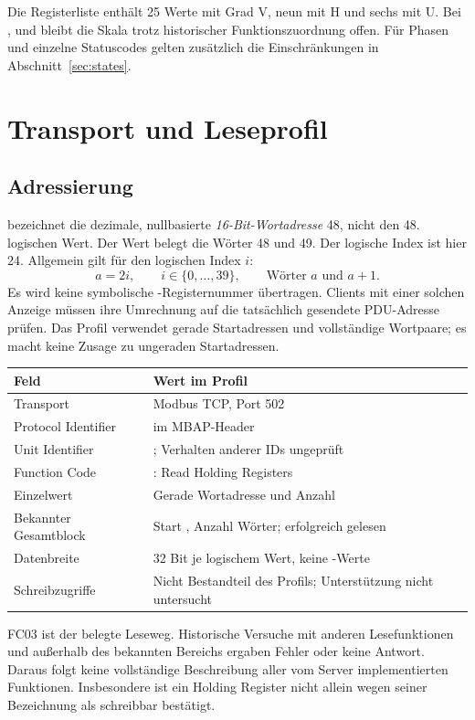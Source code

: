 \documentclass[10pt,a4paper]{article}
\begin{document}
Die Registerliste enthält 25 Werte mit Grad V, neun mit H und sechs mit U. Bei ,  und  bleibt die Skala trotz historischer Funktionszuordnung offen. Für Phasen und einzelne Statuscodes gelten zusätzlich die Einschränkungen in Abschnitt~\ref{sec:states}.

\section{Transport und Leseprofil}
\label{sec:transport}
\subsection{Adressierung}
 bezeichnet die dezimale, nullbasierte \emph{16-Bit-Wortadresse} 48, nicht den 48. logischen Wert. Der Wert belegt die Wörter 48 und 49. Der logische Index ist hier 24. Allgemein gilt für den logischen Index $i$:
\[
 a=2i,\qquad i\in\{0,\ldots,39\},\qquad \text{Wörter }a\text{ und }a+1.
\]
Es wird keine symbolische -Registernummer übertragen. Clients mit einer solchen Anzeige müssen ihre Umrechnung auf die tatsächlich gesendete PDU-Adresse prüfen. Das Profil verwendet gerade Startadressen und vollständige Wortpaare; es macht keine Zusage zu ungeraden Startadressen.

\par\noindent\begin{tabularx}{\linewidth}{@{}L{46mm}X@{}}
\toprule
\textbf{Feld} & \textbf{Wert im Profil}\\\midrule
Transport & Modbus TCP, Port 502\\
Protocol Identifier &  im MBAP-Header\\
Unit Identifier & ; Verhalten anderer IDs ungeprüft\\
Function Code & : Read Holding Registers\\
Einzelwert & Gerade Wortadresse und Anzahl \\
Bekannter Gesamtblock & Start , Anzahl  Wörter; erfolgreich gelesen\\
Datenbreite & 32 Bit je logischem Wert, keine -Werte\\
Schreibzugriffe & Nicht Bestandteil des Profils; Unterstützung nicht untersucht\\\bottomrule
\end{tabularx}\par

FC03 ist der belegte Leseweg. Historische Versuche mit anderen Lesefunktionen und außerhalb des bekannten Bereichs ergaben Fehler oder keine Antwort. Daraus folgt keine vollständige Beschreibung aller vom Server implementierten Funktionen. Insbesondere ist ein Holding Register nicht allein wegen seiner Bezeichnung als schreibbar bestätigt.
\end{document}
